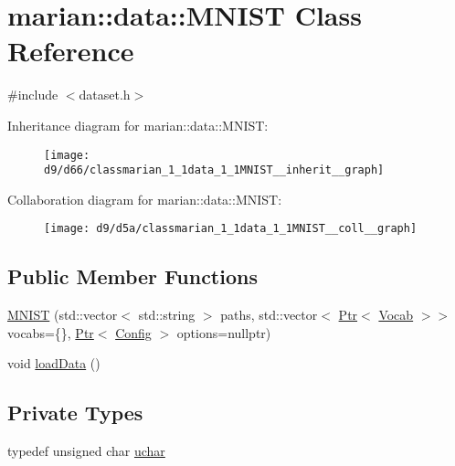 \hypertarget{classmarian_1_1data_1_1MNIST}{}\section{marian\+:\+:data\+:\+:M\+N\+I\+ST Class Reference}
\label{classmarian_1_1data_1_1MNIST}


{\ttfamily \#include $<$dataset.\+h$>$}



Inheritance diagram for marian\+:\+:data\+:\+:M\+N\+I\+ST\+:
\nopagebreak
\begin{figure}[H]
\begin{center}
\leavevmode
\texttt{[image: d9/d66/classmarian\_1\_1data\_1\_1MNIST\_\_inherit\_\_graph]}
\end{center}
\end{figure}


Collaboration diagram for marian\+:\+:data\+:\+:M\+N\+I\+ST\+:
\nopagebreak
\begin{figure}[H]
\begin{center}
\leavevmode
\texttt{[image: d9/d5a/classmarian\_1\_1data\_1\_1MNIST\_\_coll\_\_graph]}
\end{center}
\end{figure}
\subsection*{Public Member Functions}
\begin{DoxyCompactItemize}
\item 
\hyperlink{classmarian_1_1data_1_1MNIST_ac7ec3b31cd427f5dab9b5f2e207c3dd7}{M\+N\+I\+ST} (std\+::vector$<$ std\+::string $>$ paths, std\+::vector$<$ \hyperlink{namespacemarian_ad1a373be43a00ef9ce35666145137b08}{Ptr}$<$ \hyperlink{classmarian_1_1Vocab}{Vocab} $>$$>$ vocabs=\{\}, \hyperlink{namespacemarian_ad1a373be43a00ef9ce35666145137b08}{Ptr}$<$ \hyperlink{classmarian_1_1Config}{Config} $>$ options=nullptr)
\item 
void \hyperlink{classmarian_1_1data_1_1MNIST_a5e3526d45ba1bac24092e77e293a7173}{load\+Data} ()
\end{DoxyCompactItemize}
\subsection*{Private Types}
\begin{DoxyCompactItemize}
\item 
typedef unsigned char \hyperlink{classmarian_1_1data_1_1MNIST_a101b7fe6b6df1c8da1e8880ea9e177e6}{uchar}
\end{DoxyCompactItemize}
